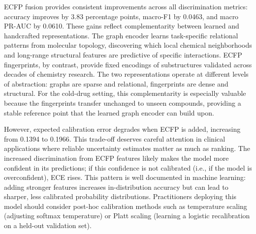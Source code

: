 \documentclass[11pt,a4paper]{report}
\begin{document}
\begin{table}[H]
\centering
\caption{Ablation: contribution of ECFP fusion under identical logit adjustment and deferred re-weighting. Mean across five cold-drug folds.}
\label{tab:ecfp_ablation}
\end{table}

ECFP fusion provides consistent improvements across all discrimination metrics: accuracy improves by 3.83 percentage points, macro-F1 by 0.0463, and macro PR-AUC by 0.0610. These gains reflect complementarity between learned and handcrafted representations. The graph encoder learns task-specific relational patterns from molecular topology, discovering which local chemical neighborhoods and long-range structural features are predictive of specific interactions. ECFP fingerprints, by contrast, provide fixed encodings of substructures validated across decades of chemistry research. The two representations operate at different levels of abstraction: graphs are sparse and relational, fingerprints are dense and structural. For the cold-drug setting, this complementarity is especially valuable because the fingerprints transfer unchanged to unseen compounds, providing a stable reference point that the learned graph encoder can build upon.

However, expected calibration error degrades when ECFP is added, increasing from 0.1394 to 0.1966. This trade-off deserves careful attention in clinical applications where reliable uncertainty estimates matter as much as ranking. The increased discrimination from ECFP features likely makes the model more confident in its predictions; if this confidence is not calibrated (i.e., if the model is overconfident), ECE rises. This pattern is well documented in machine learning: adding stronger features increases in-distribution accuracy but can lead to sharper, less calibrated probability distributions. Practitioners deploying this model should consider post-hoc calibration methods such as temperature scaling (adjusting softmax temperature) or Platt scaling (learning a logistic recalibration on a held-out validation set).
\end{document}
